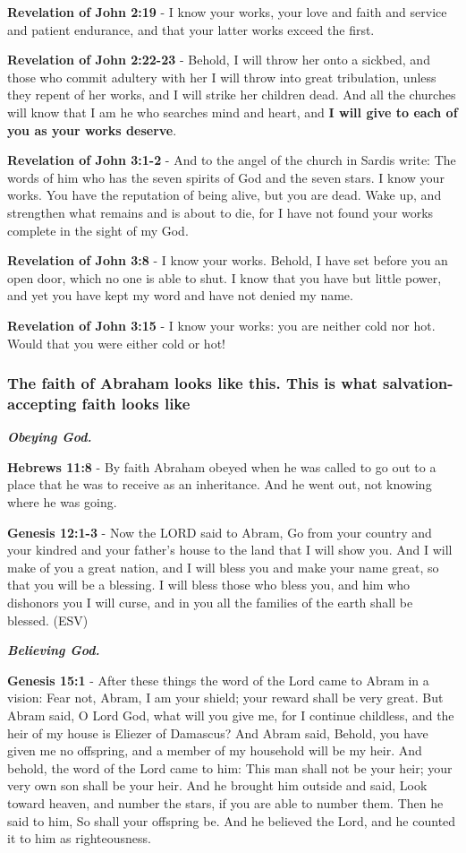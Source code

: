 \documentclass[11pt]{article}
\begin{document}
\textbf{Revelation of John 2:19} - I know your works, your love and faith and service and patient endurance, and that your latter works exceed the first.

\textbf{Revelation of John 2:22-23} - Behold, I will throw her onto a sickbed, and those who commit adultery with her I will throw into great tribulation, unless they repent of her works, and I will strike her children dead. And all the churches will know that I am he who searches mind and heart, and \textbf{I will give to each of you as your works deserve}.

\textbf{Revelation of John 3:1-2} - And to the angel of the church in Sardis write: The words of him who has the seven spirits of God and the seven stars. I know your works. You have the reputation of being alive, but you are dead. Wake up, and strengthen what remains and is about to die, for I have not found your works complete in the sight of my God.

\textbf{Revelation of John 3:8} - I know your works. Behold, I have set before you an open door, which no one is able to shut. I know that you have but little power, and yet you have kept my word and have not denied my name.

\textbf{Revelation of John 3:15} - I know your works: you are neither cold nor hot. Would that you were either cold or hot!

\subsubsection{The faith of Abraham looks like this. This is what salvation-accepting faith looks like}
\label{sec:orgb7dea4a}

\emph{\textbf{Obeying God.}}

\textbf{Hebrews 11:8} - By faith Abraham obeyed when he was called to go out to a place that he was to receive as an inheritance. And he went out, not knowing where he was going.

\textbf{Genesis 12:1-3} - Now the LORD said to Abram, Go from your country and your kindred and your father's house to the land that I will show you. And I will make of you a great nation, and I will bless you and make your name great, so that you will be a blessing. I will bless those who bless you, and him who dishonors you I will curse, and in you all the families of the earth shall be blessed. (ESV)

\emph{\textbf{Believing God.}}

\textbf{Genesis 15:1} - After these things the word of the Lord came to Abram in a vision: Fear not, Abram, I am your shield; your reward shall be very great. But Abram said, O Lord God, what will you give me, for I continue childless, and the heir of my house is Eliezer of Damascus? And Abram said, Behold, you have given me no offspring, and a member of my household will be my heir. And behold, the word of the Lord came to him: This man shall not be your heir; your very own son shall be your heir. And he brought him outside and said, Look toward heaven, and number the stars, if you are able to number them. Then he said to him, So shall your offspring be. And he believed the Lord, and he counted it to him as righteousness.
\end{document}
